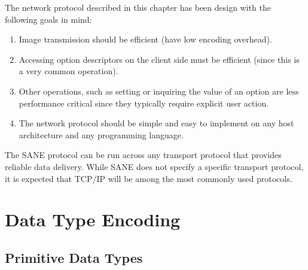 The network protocol described in this chapter has been design with
the following goals in mind:
\begin{enumerate}

\item Image transmission should be efficient (have low encoding
  overhead).

\item Accessing option descriptors on the client side must be
  efficient (since this is a very common operation).

\item Other operations, such as setting or inquiring the value of an
  option are less performance critical since they typically require
  explicit user action.

\item The network protocol should be simple and easy to implement on
  any host architecture and any programming language.

\end{enumerate}
The SANE protocol can be run across any transport protocol that
provides reliable data delivery.  While SANE does not specify a
specific transport protocol, it is expected that TCP/IP will be among
the most commonly used protocols.

\section{Data Type Encoding}

\subsection{Primitive Data Types}

